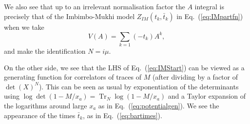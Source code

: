 \documentclass[english]{article}
\DeclareMathOperator{\Tr}{Tr}
\let\mc=\mathcal
\begin{document}
We also see that up to an irrelevant normalisation factor the $A$ integral is precisely that of the Imbimbo-Mukhi model $Z_{IM}(t_k, \bar{t}_k)$
in Eq.~(\ref{eq:IMpartfn}) when we take 
\begin{equation}
    V(A)= \sum_{k=1} (-t_{k}) A^{k},  
\end{equation}
and make the identification $N = i \mu$.


On the other side, we see that the LHS of Eq.~(\ref{eq:IMStart}) can be viewed as a generating function for correlators of traces of $M$ (after dividing by a factor of $\det(X)^N$). This can be seen as usual by exponentiation of the determinants using $\log \det(1-M/x_a) = \Tr_{N} \log (1-M/x_a)$ and a Taylor expansion of the logarithms around large $x_a$ as in Eq.~(\ref{eq:potentialgen}).  %
We see the appearance of the times $\bar{t}_k$, as in Eq.~(\ref{eq:bartimes}). 
\end{document}
